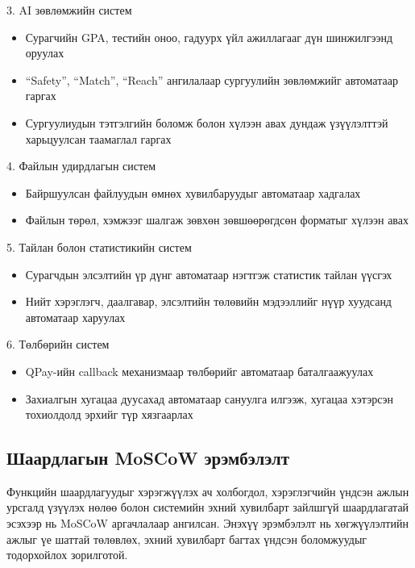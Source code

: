 3. AI зөвлөмжийн систем
\begin{itemize}
    \item Сурагчийн GPA, тестийн оноо, гадуурх үйл ажиллагааг
    дүн шинжилгээнд оруулах
    \item ``Safety'', ``Match'', ``Reach'' ангилалаар сургуулийн
    зөвлөмжийг автоматаар гаргах
    \item Сургуулиудын тэтгэлгийн боломж болон хүлээн авах
    дундаж үзүүлэлттэй харьцуулсан таамаглал гаргах
\end{itemize}

4. Файлын удирдлагын систем
\begin{itemize}
    \item Байршуулсан файлуудын өмнөх хувилбаруудыг автоматаар
    хадгалах
    \item Файлын төрөл, хэмжээг шалгаж зөвхөн зөвшөөрөгдсөн
    форматыг хүлээн авах
\end{itemize}

5. Тайлан болон статистикийн систем
\begin{itemize}
    \item Сурагчдын элсэлтийн үр дүнг автоматаар нэгтгэж
    статистик тайлан үүсгэх
    \item Нийт хэрэглэгч, даалгавар, элсэлтийн төлөвийн
    мэдээллийг нүүр хуудсанд автоматаар харуулах
\end{itemize}

6. Төлбөрийн систем
\begin{itemize}
    \item QPay-ийн callback механизмаар төлбөрийг автоматаар
    баталгаажуулах
    \item Захиалгын хугацаа дуусахад автоматаар сануулга
    илгээж, хугацаа хэтэрсэн тохиолдолд эрхийг түр
    хязгаарлах
\end{itemize}

\subsection{Шаардлагын MoSCoW эрэмбэлэлт}

Функцийн шаардлагуудыг хэрэгжүүлэх ач холбогдол, хэрэглэгчийн үндсэн
ажлын урсгалд үзүүлэх нөлөө болон системийн эхний хувилбарт зайлшгүй
шаардлагатай эсэхээр нь MoSCoW аргачлалаар ангилсан. Энэхүү эрэмбэлэлт нь
хөгжүүлэлтийн ажлыг үе шаттай төлөвлөх, эхний хувилбарт багтах үндсэн
боломжуудыг тодорхойлох зорилготой.

